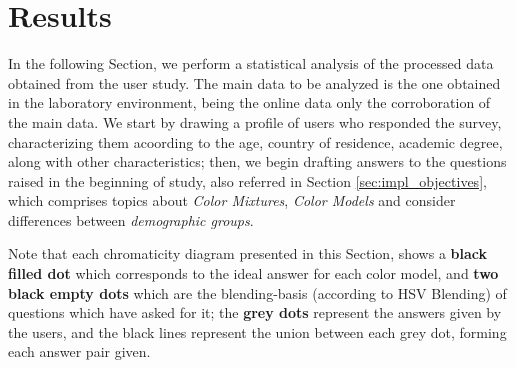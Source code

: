 \section{Results}
\label{sec:results_results}
%
In the following Section, we perform a statistical analysis of the processed data obtained from the user study. The main data to be analyzed is the one obtained in the
laboratory environment, being the online data only the corroboration of the main data. We start by drawing a profile of users who responded the survey, characterizing them acoording to the age,
country of residence, academic degree, along with other characteristics; then, we begin drafting answers to the questions raised in the beginning of study, also referred in Section
\ref{sec:impl_objectives}, which comprises topics about \emph{Color Mixtures}, \emph{Color Models} and consider differences between \emph{demographic groups}. \par
%
Note that each chromaticity diagram presented in this Section, shows a \textbf{black filled dot} which corresponds to the ideal answer for each color model, and \textbf{two black empty dots} which are the
blending-basis (according to HSV Blending) of questions which have asked for it; the \textbf{grey dots} represent the answers given by the users, and the black lines represent the union between each grey dot, forming each
answer pair given. \par
%
